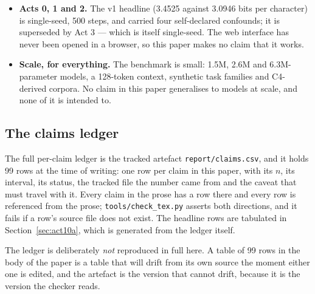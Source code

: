 \documentclass[11pt,a4paper]{article}
\begin{document}
\begin{itemize}
      model encodes which number is asserted --- is withdrawn, and the layer-5
      spike is evidence for the Act~8 bag-of-numbers bias rather than for
      assertion-reading. The bootstrap interval that travels with the top-4
      ablation, $[0.0365, 0.6390]$, is over the four individual head deltas
      and does not contain the $+1.047$ combined effect, so that effect is a
      point estimate. A backup head covers for layer 0 head 5: ablating L0 H5
      together with L0 H2 costs the same as ablating L0 H2 alone
      (redundancy 0.97), so the effect is carried by a group of layer-0 heads
      rather than by one head of 64, while L0 H5 with L1 H6 is additive
      ($+0.9591$ against a sum of $+0.908$), which rules out general
      fragility. The two-slice check is two offsets in one shard, not two
      corpora.
\item \textbf{Acts 0, 1 and 2.} The v1 headline (3.4525 against 3.0946 bits per
      character) is single-seed, 500 steps, and carried four self-declared
      confounds; it is superseded by Act 3 --- which is itself single-seed. The
      web interface has never been opened in a browser, so this paper makes no
      claim that it works.
\item \textbf{Scale, for everything.} The benchmark is small: 1.5M, 2.6M and
      6.3M-parameter models, a 128-token context, synthetic task families and
      C4-derived corpora. No claim in this paper generalises to models at
      scale, and none of it is intended to. %

\end{itemize}

\subsection{The claims ledger}
\label{sec:claims-ledger}

The full per-claim ledger is the tracked artefact \texttt{report/claims.csv},
and it holds 99 rows at the time of writing: one row per claim in this paper,
with its $n$, its interval, its status, the tracked file the number came from
and the caveat that must travel with it. Every claim in the prose has a row
there and every row is referenced from the prose; \texttt{tools/check\_tex.py}
asserts both directions, and it fails if a row's source file does not exist.
The headline rows are tabulated in Section~\ref{sec:act10a}, which is
generated from the ledger itself.

The ledger is deliberately \emph{not} reproduced in full here. A table of 99
rows in the body of the paper is a table that will drift from its own source
the moment either one is edited, and the artefact is the version that cannot
drift, because it is the version the checker reads.
\end{document}
